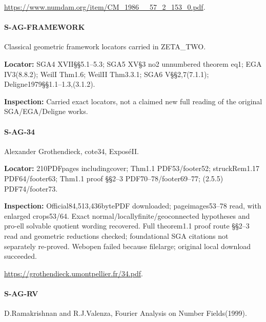 \documentclass[11pt,a4paper]{article}
\begin{document}
\url{https://www.numdam.org/item/CM_1986__57_2_153_0.pdf}.

\paragraph{S-AG-FRAMEWORK} Classical geometric framework locators carried in ZETA\_\allowbreak{}TWO.

\textbf{Locator:} SGA4 XVII§§5.\allowbreak{}1–\allowbreak{}5.\allowbreak{}3; SGA5 XV§3 no2 unnumbered theorem eq1; EGA IV3(8.\allowbreak{}8.\allowbreak{}2); WeilI Thm1.\allowbreak{}6; WeilII Thm3.\allowbreak{}3.\allowbreak{}1; SGA6 V§§2,7(7.\allowbreak{}1.\allowbreak{}1); Deligne1979§§1.\allowbreak{}1–\allowbreak{}1.\allowbreak{}3,(3.\allowbreak{}1.\allowbreak{}2).

\textbf{Inspection:} Carried exact locators, not a claimed new full reading of the original SGA/\allowbreak{}EGA/\allowbreak{}Deligne works.\allowbreak{}


\paragraph{S-AG-34} Alexander Grothendieck, cote34, ExposéII.

\textbf{Locator:} 210PDFpages includingcover; Thm1.\allowbreak{}1 PDF53/\allowbreak{}footer52; struckRem1.\allowbreak{}17 PDF64/\allowbreak{}footer63; Thm1.\allowbreak{}1 proof §§2–\allowbreak{}3 PDF70–\allowbreak{}78/\allowbreak{}footer69–\allowbreak{}77; (2.\allowbreak{}5.\allowbreak{}5) PDF74/\allowbreak{}footer73.

\textbf{Inspection:} Official84,513,436bytePDF downloaded; pageimages53–\allowbreak{}78 read, with enlarged crops53/\allowbreak{}64.\allowbreak{} Exact normal/\allowbreak{}locallyfinite/\allowbreak{}geoconnected hypotheses and pro-ell solvable quotient wording recovered.\allowbreak{} Full theorem1.\allowbreak{}1 proof route §§2–\allowbreak{}3 read and geometric reductions checked; foundational SGA citations not separately re-proved.\allowbreak{} Webopen failed because filelarge; original local download succeeded.\allowbreak{}

\url{https://grothendieck.umontpellier.fr/34.pdf}.

\paragraph{S-AG-RV} D.\allowbreak{}Ramakrishnan and R.\allowbreak{}J.\allowbreak{}Valenza, Fourier Analysis on Number Fields(1999).
\end{document}
